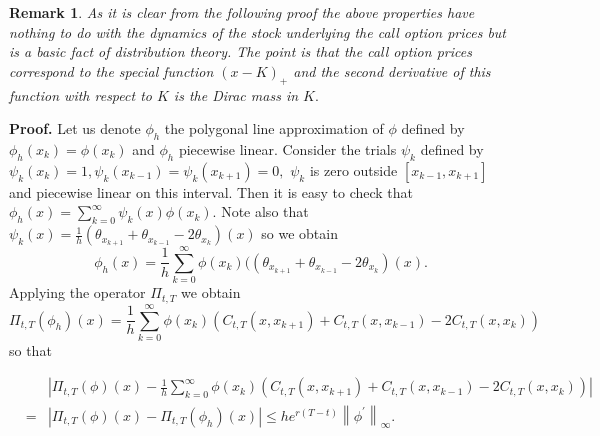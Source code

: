 \documentclass[a4paper]{article}
\newtheorem{remark}{Remark}[section]
\begin{document}
\begin{remark}
As it is clear from the following proof the above properties have nothing to
do with the dynamics of the stock underlying the call option prices but is a
basic fact of distribution theory. The point is that the call option prices
correspond to the special function $(x-K)_{+}$ and the second derivative of
this function with respect to $K$ is the Dirac mass in $K.$
\end{remark}

\textbf{Proof.} Let us denote $\phi _{h}$ the polygonal line approximation
of $\phi $ defined by $\phi _{h}(x_{k})=\phi (x_{k})$ and $\phi _{h}$
piecewise linear$.$ Consider the trials $\psi _{k}$ defined by $\psi
_{k}(x_{k})=1,\psi _{k}(x_{k-1})=\psi _{k}(x_{k+1})=0,$ $\psi _{k}$ is zero
outside $[x_{k-1},x_{k+1}]$ and piecewise linear on this interval. Then it is
easy to check that $\phi _{h}(x)=\sum_{k=0}^{\infty }\psi _{k}(x)\phi
(x_{k}).$ Note also that $\psi _{k}(x)=\frac{1}{h}(\theta _{x_{k+1}}+\theta
_{x_{k-1}}-2\theta _{x_{k}})(x)$ so we obtain
\[
\phi _{h}(x)=\frac{1}{h}\sum_{k=0}^{\infty }\phi (x_{k})((\theta
_{x_{k+1}}+\theta _{x_{k-1}}-2\theta _{x_{k}})(x).
\]
Applying the operator $\Pi _{t,T}$ we obtain
\[
\Pi _{t,T}(\phi _{h})(x)=\frac{1}{h}\sum_{k=0}^{\infty }\phi
(x_{k})(C_{t,T}(x,x_{k+1})+C_{t,T}(x,x_{k-1})-2C_{t,T}(x,x_{k}))
\]
so that

\begin{eqnarray*}
&&\left| \Pi _{t,T}(\phi )(x)-\frac{1}{h}\sum_{k=0}^{\infty }\phi
(x_{k})(C_{t,T}(x,x_{k+1})+C_{t,T}(x,x_{k-1})-2C_{t,T}(x,x_{k}))\right| \\
&=&\left| \Pi _{t,T}(\phi )(x)-\Pi _{t,T}(\phi _{h})(x)\right| \leq
he^{r(T-t)}\left\| \phi ^{\prime }\right\| _{\infty }.
\end{eqnarray*}
\end{document}
